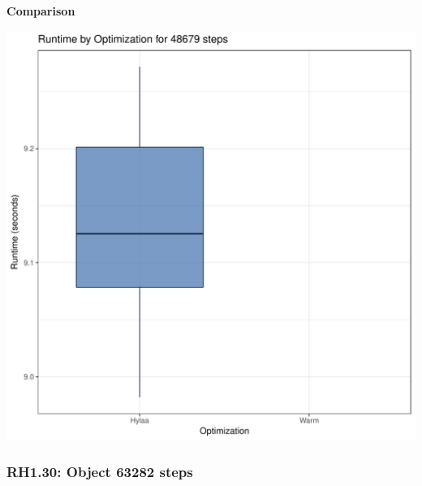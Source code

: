 \documentclass{article}\usepackage[]{graphicx}\usepackage[]{color}
\makeatletter
\def\maxwidth{ %
  \ifdim\Gin@nat@width>\linewidth
    \linewidth
  \else
    \Gin@nat@width
  \fi
}
\newenvironment{knitrout}{}{} %
\makeatother
\begin{document}
 \textbf{Comparison}
  
\begin{knitrout}
\color{fgcolor}
\includegraphics[width=\maxwidth]{figure/RH1_steps48679-1} 

\end{knitrout}


\subsubsection{RH1.30: Object 63282 steps}
\end{document}
